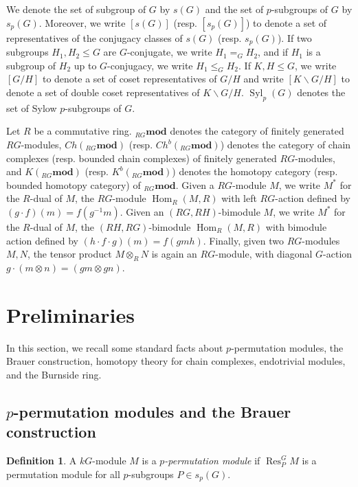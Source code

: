 \documentclass[10pt,letterpaper, boxed, cm]{amsart}
\newcommand{\Hom}{\operatorname{Hom}}
\newcommand{\inv}{^{-1}}
\newcommand{\Res}{\operatorname{Res}}
\newcommand{\Syl}{\operatorname{Syl}}
\theoremstyle{remark}
\theoremstyle{definition}
\newtheorem{definition}[theorem]{Definition}
\begin{document}
	We denote the set of subgroup of $G$ by $s(G)$ and the set of $p$-subgroups of $G$ by $s_p(G)$. Moreover, we write $[s(G)]$ (resp. $[s_p(G)]$) to denote a set of representatives of the conjugacy classes of $s(G)$ (resp. $s_p(G)$). If two subgroups $H_1, H_2 \leq G$ are $G$-conjugate, we write $H_1 =_G H_2$, and if $H_1$ is a subgroup of $H_2$ up to $G$-conjugacy, we write $H_1 \leq_G H_2$. If $K, H \leq G$, we write $[G/H]$ to denote a set of coset representatives of $G/H$ and write $[K\backslash G/H]$ to denote a set of double coset representatives of $K \backslash G/H$. $\Syl_p(G)$ denotes the set of Sylow $p$-subgroups of $G$.

	Let $R$ be a commutative ring. ${}_{RG}\mathbf{mod}$ denotes the category of finitely generated $RG$-modules, $Ch({}_{RG}\mathbf{mod})$ (resp. $Ch^b({}_{RG}\mathbf{mod})$) denotes the category of chain complexes (resp. bounded chain complexes) of finitely generated $RG$-modules, and $K({}_{RG}\mathbf{mod})$ (resp. $K^b({}_{RG}\mathbf{mod})$) denotes the homotopy category (resp. bounded homotopy category) of ${}_{RG}\mathbf{mod}$. Given a $RG$-module $M$, we write $M^*$ for the $R$-dual of $M$, the $RG$-module $\Hom_R(M,R)$ with left $RG$-action defined by $(g\cdot f)(m) = f(g\inv m)$. Given an $(RG,RH)$-bimodule $M$, we write $M^*$ for the $R$-dual of $M$, the $(RH,RG)$-bimodule $\Hom_R(M, R)$ with bimodule action defined by $(h\cdot f\cdot g)(m) = f(g m h)$. Finally, given two $RG$-modules $M, N$, the tensor product $M \otimes_R N$ is again an $RG$-module, with diagonal $G$-action $g\cdot (m\otimes n) = (gm \otimes gn)$.


	\section{Preliminaries}\label{prelims}

	In this section, we recall some standard facts about $p$-permutation modules, the Brauer construction, homotopy theory for chain complexes, endotrivial modules, and the Burnside ring.

	\subsection{$p$-permutation modules and the Brauer construction}

	\begin{definition}
		A $kG$-module $M$ is a \textit{$p$-permutation module} if $\Res^G_P M$ is a permutation module for all $p$-subgroups $P\in s_p(G)$.
	\end{definition}
\end{document}
